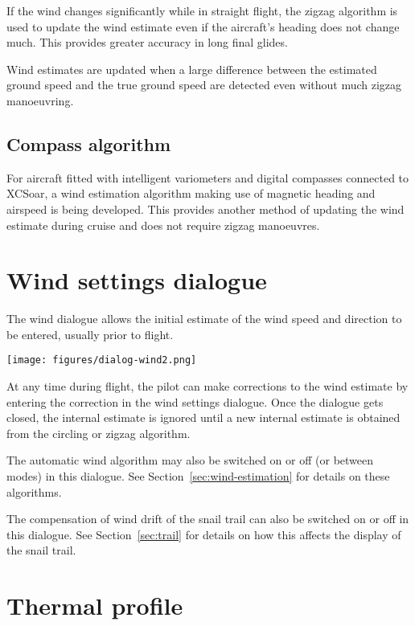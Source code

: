 If the wind changes significantly while in straight flight, the
zigzag algorithm is used to update the wind estimate even if the
aircraft's heading does not change much. This provides greater
accuracy in long final glides.

Wind estimates are updated when a large difference between the
estimated ground speed and the true ground speed are detected even
without much zigzag manoeuvring.

\subsection*{Compass algorithm}

For aircraft fitted with intelligent variometers and digital compasses
connected to XCSoar, a wind estimation algorithm making use of
magnetic heading and airspeed is being developed.  This provides
another method of updating the wind estimate during cruise and does
not require zigzag manoeuvres.

\section{Wind settings dialogue}\label{sec:wind-setup}

The wind dialogue allows the initial estimate of the wind speed and
direction to be entered, usually prior to flight.

\begin{center}
\texttt{[image: figures/dialog-wind2.png]}
\end{center}

At any time during flight, the pilot can make corrections to the wind
estimate by entering the correction in the wind settings dialogue.  Once the
dialogue gets closed, the internal estimate is ignored until a new internal
estimate is obtained from the circling or zigzag algorithm.

The automatic wind algorithm may also be switched on or off (or
between modes) in this dialogue.  See Section~\ref{sec:wind-estimation}
for details on these algorithms.

The compensation of wind drift of the snail trail can also be switched
on or off in this dialogue.  See Section~\ref{sec:trail} for details on
how this affects the display of the snail trail.

\section{Thermal profile}

